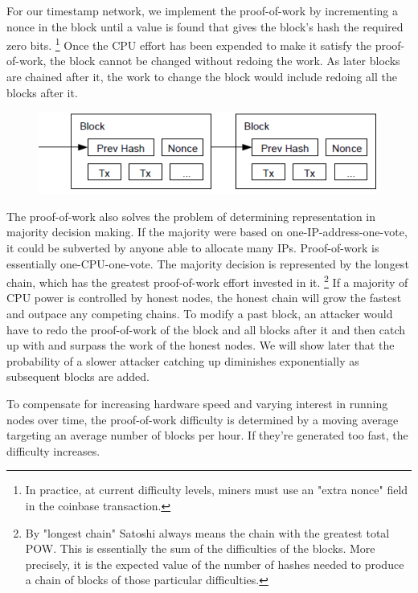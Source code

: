 \documentclass[nohyper]{tufte-handout}
\begin{document}
For our timestamp network, we implement the proof-of-work by
incrementing a nonce in the block until a value is found that gives the
block's hash the required zero bits. \footnote{In practice, at current difficulty levels, miners must use an "extra nonce" field in the coinbase transaction. } Once the CPU effort has been
expended to make it satisfy the proof-of-work, the block cannot be
changed without redoing the work. As later blocks are chained after it,
the work to change the block would include redoing all the blocks after
it.

\begin{figure}[!h]
\centering
\includegraphics[width=0.75\linewidth]{proof-of-work.png}
\end{figure}

The proof-of-work also solves the problem of determining representation
in majority decision making. If the majority were based on
one-IP-address-one-vote, it could be subverted by anyone able to
allocate many IPs. Proof-of-work is essentially one-CPU-one-vote. The
majority decision is represented by the longest chain, which has the greatest proof-of-work effort invested in it.  \footnote{By "longest chain" Satoshi always means the chain with the greatest total POW.  This is essentially the sum of the difficulties of the blocks.  More precisely, it is the expected value of the number of hashes needed to produce a chain of blocks of those particular difficulties.} If a majority of CPU power is controlled by honest nodes, the honest chain will grow the fastest and outpace any competing chains. To modify a past block, an attacker would have to redo the proof-of-work of the block and all blocks after
it and then catch up with and surpass the work of the honest nodes. We will show later that the probability of a slower attacker catching up
diminishes exponentially as subsequent blocks are added.

To compensate for increasing hardware speed and varying interest in running nodes over time, the proof-of-work difficulty is determined by a moving average targeting an average number of blocks per hour. If they're generated too fast, the difficulty increases.  
\end{document}
